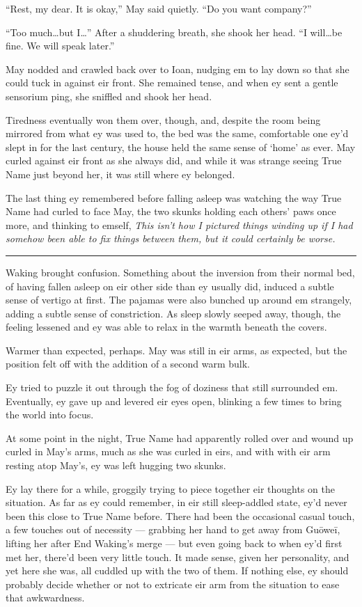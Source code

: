 ``Rest, my dear. It is okay,'' May said quietly. ``Do you want company?''

``Too much\ldots but I\ldots{}'' After a shuddering breath, she shook her head. ``I will\ldots be fine. We will speak later.''

May nodded and crawled back over to Ioan, nudging em to lay down so that she could tuck in against eir front. She remained tense, and when ey sent a gentle sensorium ping, she sniffled and shook her head.

Tiredness eventually won them over, though, and, despite the room being mirrored from what ey was used to, the bed was the same, comfortable one ey'd slept in for the last century, the house held the same sense of `home' as ever. May curled against eir front as she always did, and while it was strange seeing True Name just beyond her, it was still where ey belonged.

The last thing ey remembered before falling asleep was watching the way True Name had curled to face May, the two skunks holding each others' paws once more, and thinking to emself, \emph{This isn't how I pictured things winding up if I had somehow been able to fix things between them, but it could certainly be worse.}

\begin{center}\rule{0.5\linewidth}{0.5pt}\end{center}

Waking brought confusion. Something about the inversion from their normal bed, of having fallen asleep on eir other side than ey usually did, induced a subtle sense of vertigo at first. The pajamas were also bunched up around em strangely, adding a subtle sense of constriction. As sleep slowly seeped away, though, the feeling lessened and ey was able to relax in the warmth beneath the covers.

Warmer than expected, perhaps. May was still in eir arms, as expected, but the position felt off with the addition of a second warm bulk.

Ey tried to puzzle it out through the fog of doziness that still surrounded em. Eventually, ey gave up and levered eir eyes open, blinking a few times to bring the world into focus.

At some point in the night, True Name had apparently rolled over and wound up curled in May's arms, much as she was curled in eirs, and with with eir arm resting atop May's, ey was left hugging two skunks.

Ey lay there for a while, groggily trying to piece together eir thoughts on the situation. As far as ey could remember, in eir still sleep-addled state, ey'd never been this close to True Name before. There had been the occasional casual touch, a few touches out of necessity — grabbing her hand to get away from Guōweī, lifting her after End Waking's merge — but even going back to when ey'd first met her, there'd been very little touch. It made sense, given her personality, and yet here she was, all cuddled up with the two of them. If nothing else, ey should probably decide whether or not to extricate eir arm from the situation to ease that awkwardness.

